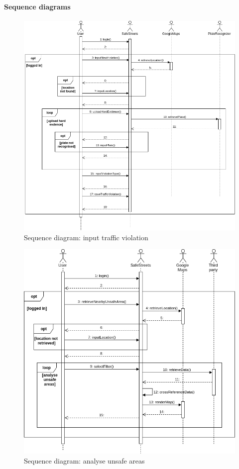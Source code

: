 \documentclass{article}
\begin{document}
\paragraph{Sequence diagrams}

\begin{figure}[H]
    \centering
    \includegraphics[scale=0.45]{Images/SequenceReportViolation}
    \caption{Sequence diagram: input traffic violation}
\end{figure}

\begin{figure}[H]
    \centering
    \includegraphics[scale=0.5]{Images/SequenceUserAnalyseUnsafeAreas} 
    \caption{Sequence diagram: analyse unsafe areas}
\end{figure}
\end{document}
